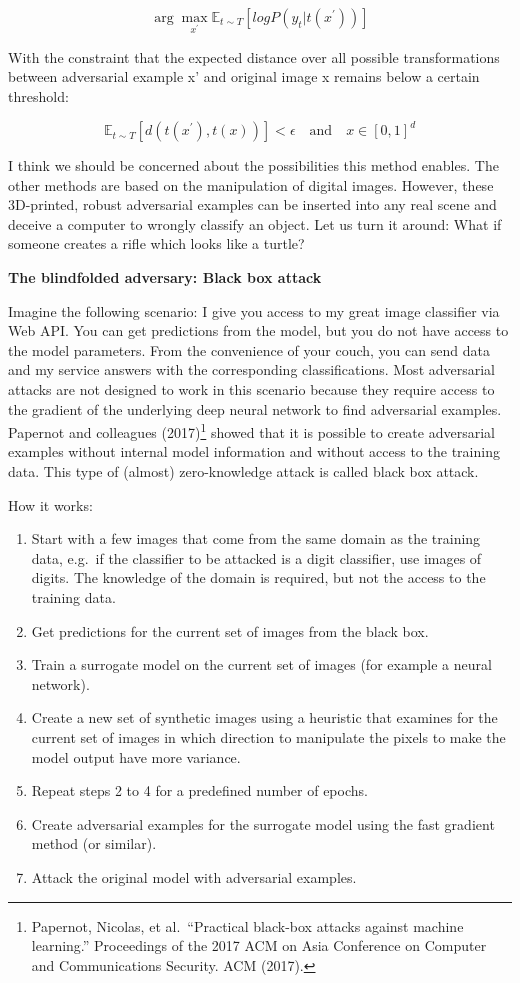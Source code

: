 \documentclass[
  11pt,
]{scrbook}
\providecommand{\tightlist}{%
  \setlength{\itemsep}{0pt}\setlength{\parskip}{0pt}}
\begin{document}
\[\arg\max_{x^\prime}\mathbb{E}_{t\sim{}T}[log{}P(y_t|t(x^\prime))]\]

With the constraint that the expected distance over all possible transformations between adversarial example x' and original image x remains below a certain threshold:

\[\mathbb{E}_{t\sim{}T}[d(t(x^\prime),t(x))]<\epsilon\quad\text{and}\quad{}x\in[0,1]^d\]

I think we should be concerned about the possibilities this method enables.
The other methods are based on the manipulation of digital images.
However, these 3D-printed, robust adversarial examples can be inserted into any real scene and deceive a computer to wrongly classify an object.
Let us turn it around: What if someone creates a rifle which looks like a turtle?

\textbf{The blindfolded adversary: Black box attack}

Imagine the following scenario:
I give you access to my great image classifier via Web API.
You can get predictions from the model, but you do not have access to the model parameters.
From the convenience of your couch, you can send data and my service answers with the corresponding classifications.
Most adversarial attacks are not designed to work in this scenario because they require access to the gradient of the underlying deep neural network to find adversarial examples.
Papernot and colleagues (2017)\footnote{Papernot, Nicolas, et al.~``Practical black-box attacks against machine learning.'' Proceedings of the 2017 ACM on Asia Conference on Computer and Communications Security. ACM (2017).} showed that it is possible to create adversarial examples without internal model information and without access to the training data.
This type of (almost) zero-knowledge attack is called black box attack.

How it works:

\begin{enumerate}
\def\labelenumi{\arabic{enumi}.}
\tightlist
\item
  Start with a few images that come from the same domain as the training data, e.g.~if the classifier to be attacked is a digit classifier, use images of digits. The knowledge of the domain is required, but not the access to the training data.
\item
  Get predictions for the current set of images from the black box.
\item
  Train a surrogate model on the current set of images (for example a neural network).
\item
  Create a new set of synthetic images using a heuristic that examines for the current set of images in which direction to manipulate the pixels to make the model output have more variance.
\item
  Repeat steps 2 to 4 for a predefined number of epochs.
\item
  Create adversarial examples for the surrogate model using the fast gradient method (or similar).
\item
  Attack the original model with adversarial examples.
\end{enumerate}
\end{document}

